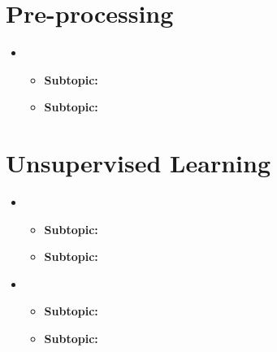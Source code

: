 \section{Pre-processing}
\medskip
\begin{itemize}

    \item {}

    \begin{itemize}
    \item \textbf{Subtopic:} 
    \item \textbf{Subtopic:} 
    \end{itemize}


\end{itemize}


\section{Unsupervised Learning}
\medskip
\begin{itemize}

    \item {}

    \begin{itemize}
    \item \textbf{Subtopic:} 
    \item \textbf{Subtopic:} 
    \end{itemize}

    \item {}

    \begin{itemize}
    \item \textbf{Subtopic:} 
    \item \textbf{Subtopic:} 
    \end{itemize}



\end{itemize}

